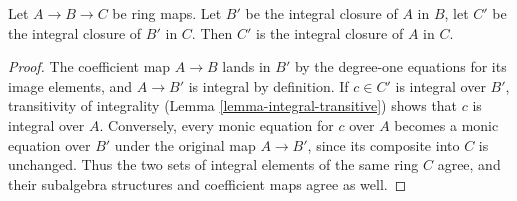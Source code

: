 \begin{lemma}
\label{lemma-integral-closure-transitive}
Let $A \to B \to C$ be ring maps.
Let $B'$ be the integral closure of $A$ in $B$,
let $C'$ be the integral closure of $B'$ in $C$. Then
$C'$ is the integral closure of $A$ in $C$.
\end{lemma}

\begin{proof}
The coefficient map $A\to B$ lands in $B'$ by the degree-one
equations for its image elements, and $A\to B'$ is integral by
definition. If $c\in C'$ is integral over $B'$, transitivity of
integrality (Lemma \ref{lemma-integral-transitive}) shows that $c$
is integral over $A$. Conversely, every monic equation for $c$
over $A$ becomes a monic equation over $B'$ under the original
map $A\to B'$, since its composite into $C$ is unchanged.
Thus the two sets of integral elements of the same ring $C$ agree,
and their subalgebra structures and coefficient maps agree as well.
\end{proof}